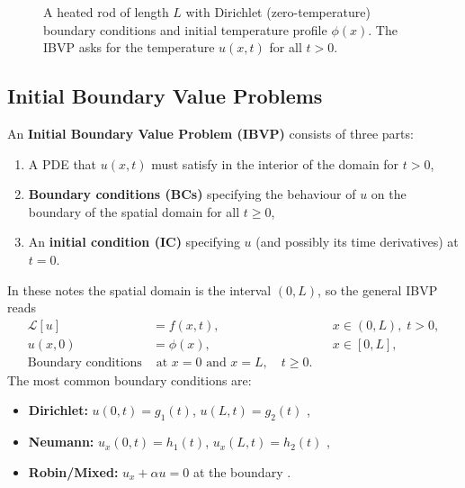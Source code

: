 \documentclass[12pt,a4paper]{article}
\theoremstyle{plain}
\theoremstyle{definition}
\begin{document}
\begin{figure}[H]
\centering
{}
\caption{A heated rod of length $L$ with Dirichlet (zero-temperature) boundary
  conditions and initial temperature profile $\phi(x)$. The IBVP asks for the
  temperature $u(x,t)$ for all $t>0$.}
\label{fig:rod}
\end{figure}

\subsection{Initial Boundary Value Problems}

An \textbf{Initial Boundary Value Problem (IBVP)} consists of three parts:
\begin{enumerate}[label=(\roman*)]
  \item A PDE that $u(x,t)$ must satisfy in the interior of the domain for $t>0$,
  \item \textbf{Boundary conditions (BCs)} specifying the behaviour of $u$ on
        the boundary of the spatial domain for all $t\geq 0$,
  \item An \textbf{initial condition (IC)} specifying $u$ (and possibly its time
        derivatives) at $t=0$.
\end{enumerate}
In these notes the spatial domain is the interval $(0,L)$, so the general IBVP reads
\begin{align}
  \mathcal{L}[u] &= f(x,t), && x\in(0,L),\; t>0, \label{eq:IBVP-pde}\\
  u(x,0)         &= \phi(x), && x\in[0,L], \label{eq:IBVP-ic}\\
  \text{Boundary conditions} &\text{ at } x=0 \text{ and } x=L, \quad t\geq 0. \label{eq:IBVP-bc}
\end{align}
The most common boundary conditions are:
\begin{itemize}
  \item \textbf{Dirichlet:} $u(0,t)=g_1(t)$, $u(L,t)=g_2(t)$ ,
  \item \textbf{Neumann:} $u_x(0,t)=h_1(t)$, $u_x(L,t)=h_2(t)$ ,
  \item \textbf{Robin/Mixed:} $u_x + \alpha u = 0$ at the boundary .
\end{itemize}
\end{document}
